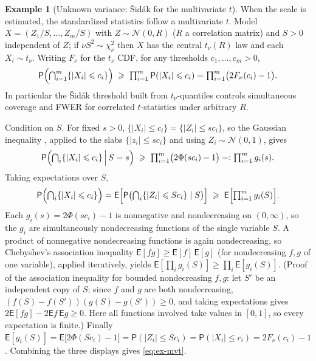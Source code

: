 \documentclass[12pt,a4paper]{article}
\makeatletter
\theoremstyle{definition}
\newtheorem{example}[theorem]{Example}
\renewenvironment{proof}[1][\proofname]{\par
  \pushQED{\qed}%
  \normalfont \topsep6\p@\@plus6\p@\relax
  \trivlist
  \item[\hskip\labelsep\bfseries #1\@addpunct{.}]\ignorespaces
}{%
  \popQED\endtrivlist\@endpefalse
}
\newcommand{\PP}{\mathsf{P}}
\newcommand{\EE}{\mathsf{E}}
\newcommand{\caln}{\mathcal{N}}
\makeatother
\begin{document}
\begin{example}[Unknown variance: \v{S}id\'ak for the multivariate $t$]
  \label{ex:mvt}
  When the scale is estimated, the standardized statistics follow a
  multivariate $t$.  Model $X=(Z_1/S,\ldots,Z_m/S)$ with $Z\sim\caln(0,R)$
  ($R$ a correlation matrix) and $S>0$ independent of $Z$; if $\nu
  S^2\sim\chi^2_\nu$ then $X$ has the central $t_\nu(R)$ law and each
  $X_i\sim t_\nu$.  Writing $F_\nu$ for the $t_\nu$ CDF, for any
  thresholds $c_1,\ldots,c_m>0$,
  \begin{equation}\label{eq:ex-mvt}
    \PP\Bigl(\textstyle\bigcap_{i=1}^m\{|X_i|\leqslant c_i\}\Bigr)
    \;\geqslant\;\prod_{i=1}^m\PP(|X_i|\leqslant c_i)
    =\prod_{i=1}^m\bigl(2F_\nu(c_i)-1\bigr).
  \end{equation}
  In particular the \v{S}id\'ak threshold built from $t_\nu$-quantiles
  controls simultaneous coverage and FWER for correlated $t$-statistics
  under arbitrary $R$.
\end{example}

\begin{proof}
  Condition on $S$.  For fixed $s>0$, $\{|X_i|\leqslant c_i\}=\{|Z_i|
  \leqslant sc_i\}$, so the Gaussian inequality ,
  applied to the slabs $\{|z_i|\leqslant sc_i\}$ and using
  $Z_i\sim\caln(0,1)$, gives
  \[
    \PP\Bigl(\textstyle\bigcap_i\{|X_i|\leqslant c_i\}\,\Big|\,S=s\Bigr)
    \;\geqslant\;\prod_{i=1}^m\bigl(2\Phi(sc_i)-1\bigr)
    =:\prod_{i=1}^m g_i(s).
  \]
  Taking expectations over $S$,
  \[
    \PP\Bigl(\textstyle\bigcap_i\{|X_i|\leqslant c_i\}\Bigr)
    =\EE\Bigl[\PP\bigl(\textstyle\bigcap_i\{|Z_i|\leqslant Sc_i\}\mid S\bigr)\Bigr]
    \;\geqslant\;\EE\Bigl[\prod_{i=1}^m g_i(S)\Bigr].
  \]
  Each $g_i(s)=2\Phi(sc_i)-1$ is nonnegative and nondecreasing on
  $(0,\infty)$, so the $g_i$ are simultaneously nondecreasing functions
  of the single variable $S$.  A product of nonnegative nondecreasing
  functions is again nondecreasing, so Chebyshev's association
  inequality $\EE[fg]\geqslant\EE[f]\,\EE[g]$ (for nondecreasing $f,g$ of
  one variable), applied iteratively, yields
  $\EE[\prod_i g_i(S)]\geqslant\prod_i\EE[g_i(S)]$.  (Proof of the
  association inequality for bounded nondecreasing $f,g$: let $S'$ be
  an independent copy of $S$; since $f$ and $g$ are both nondecreasing,
  $(f(S)-f(S'))(g(S)-g(S'))\geqslant 0$, and taking expectations gives
  $2\EE[fg]-2\EE f\,\EE g\geqslant 0$.  Here all functions involved
  take values in $[0,1]$, so every expectation is finite.)  Finally
  $\EE[g_i(S)]=\EE\bigl[2\Phi(Sc_i)-1\bigr]
  =\PP(|Z_i|\leqslant Sc_i)=\PP(|X_i|\leqslant c_i)=2F_\nu(c_i)-1$.
  Combining the three displays gives \eqref{eq:ex-mvt}.
\end{proof}
\end{document}
